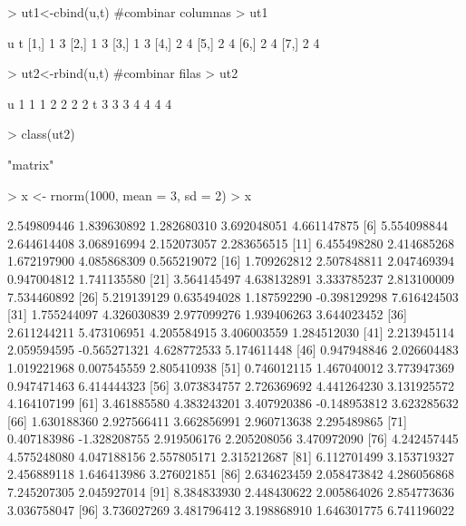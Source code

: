 \documentclass[12pt]{article}
\begin{document}
\begin{Schunk}
\begin{Soutput}
\end{Soutput}
\begin{Sinput}
> ut1<-cbind(u,t) #combinar columnas
> ut1
\end{Sinput}
\begin{Soutput}
     u t
[1,] 1 3
[2,] 1 3
[3,] 1 3
[4,] 2 4
[5,] 2 4
[6,] 2 4
[7,] 2 4
\end{Soutput}
\begin{Sinput}
> ut2<-rbind(u,t) #combinar filas
> ut2
\end{Sinput}
\begin{Soutput}
  [,1] [,2] [,3] [,4] [,5] [,6] [,7]
u    1    1    1    2    2    2    2
t    3    3    3    4    4    4    4
\end{Soutput}
\begin{Sinput}
> class(ut2)
\end{Sinput}
\begin{Soutput}
[1] "matrix"
\end{Soutput}
\begin{Sinput}
> x <- rnorm(1000, mean = 3, sd = 2) 
> x
\end{Sinput}
\begin{Soutput}
   [1]  2.549809446  1.839630892  1.282680310  3.692048051  4.661147875
   [6]  5.554098844  2.644614408  3.068916994  2.152073057  2.283656515
  [11]  6.455498280  2.414685268  1.672197900  4.085868309  0.565219072
  [16]  1.709262812  2.507848811  2.047469394  0.947004812  1.741135580
  [21]  3.564145497  4.638132891  3.333785237  2.813100009  7.534460892
  [26]  5.219139129  0.635494028  1.187592290 -0.398129298  7.616424503
  [31]  1.755244097  4.326030839  2.977099276  1.939406263  3.644023452
  [36]  2.611244211  5.473106951  4.205584915  3.406003559  1.284512030
  [41]  2.213945114  2.059594595 -0.565271321  4.628772533  5.174611448
  [46]  0.947948846  2.026604483  1.019221968  0.007545559  2.805410938
  [51]  0.746012115  1.467040012  3.773947369  0.947471463  6.414444323
  [56]  3.073834757  2.726369692  4.441264230  3.131925572  4.164107199
  [61]  3.461885580  4.383243201  3.407920386 -0.148953812  3.623285632
  [66]  1.630188360  2.927566411  3.662856991  2.960713638  2.295489865
  [71]  0.407183986 -1.328208755  2.919506176  2.205208056  3.470972090
  [76]  4.242457445  4.575248080  4.047188156  2.557805171  2.315212687
  [81]  6.112701499  3.153719327  2.456889118  1.646413986  3.276021851
  [86]  2.634623459  2.058473842  4.286056868  7.245207305  2.045927014
  [91]  8.384833930  2.448430622  2.005864026  2.854773636  3.036758047
  [96]  3.736027269  3.481796412  3.198868910  1.646301775  6.741196022

\end{Soutput}
\end{Schunk}
\end{document}
